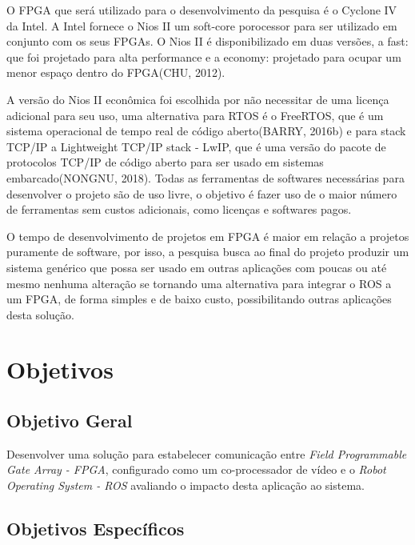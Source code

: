O FPGA que será utilizado para o desenvolvimento da pesquisa é o Cyclone IV
da Intel. A Intel fornece o Nios II um soft-core porocessor para ser utilizado em conjunto
com os seus FPGAs. O Nios II é disponibilizado em duas versões, a fast: que foi projetado
para alta performance e a economy: projetado para ocupar um menor espaço dentro do
FPGA(CHU, 2012).

A versão do Nios II econômica foi escolhida por não necessitar de uma licença
adicional para seu uso, uma alternativa para RTOS é o FreeRTOS, que é um sistema
operacional de tempo real de código aberto(BARRY, 2016b) e para stack TCP/IP a
Lightweight TCP/IP stack - LwIP, que é uma versão do pacote de protocolos TCP/IP
de código aberto para ser usado em sistemas embarcado(NONGNU, 2018). Todas as
ferramentas de softwares necessárias para desenvolver o projeto são de uso livre, o objetivo 
é fazer uso de o maior número de ferramentas sem custos adicionais, como licenças e
softwares pagos.

O tempo de desenvolvimento de projetos em FPGA é maior em relação a projetos
puramente de software, por isso, a pesquisa busca ao final do projeto produzir um sistema
genérico que possa ser usado em outras aplicações com poucas ou até mesmo nenhuma
alteração se tornando uma alternativa para integrar o ROS a um FPGA, de forma simples
e de baixo custo, possibilitando outras aplicações desta solução.

\section{Objetivos}

\subsection{Objetivo Geral}

Desenvolver uma solução para estabelecer comunicação entre \textit{Field Programmable
Gate Array - FPGA}, configurado como um co-processador de vídeo e o  \textit{Robot Operating
System - ROS} avaliando o impacto desta aplicação ao sistema.

\subsection{Objetivos Específicos}

